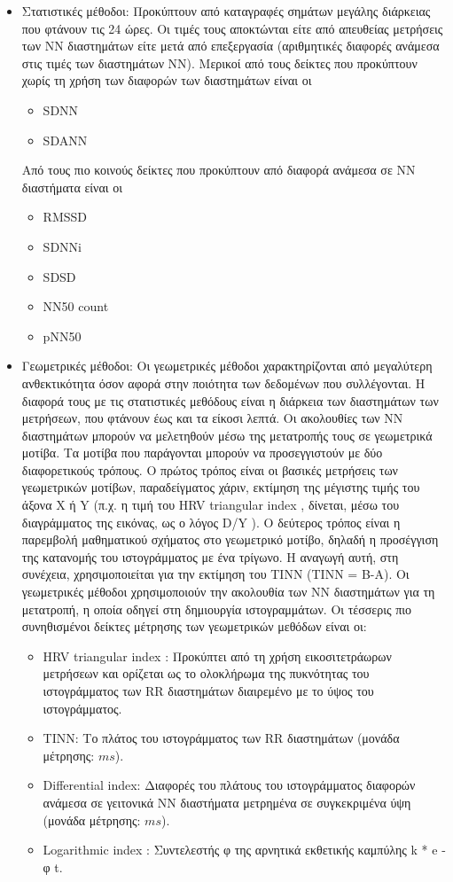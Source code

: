 \begin{itemize}
	\item Στατιστικές μέθοδοι: Προκύπτουν από καταγραφές σημάτων μεγάλης διάρκειας που φτάνουν τις 24 ώρες. Οι τιμές τους αποκτώνται είτε από απευθείας μετρήσεις των ΝΝ διαστημάτων είτε μετά από επεξεργασία (αριθμητικές διαφορές ανάμεσα στις τιμές των διαστημάτων ΝΝ). Μερικοί από τους δείκτες που προκύπτουν χωρίς τη χρήση των διαφορών των διαστημάτων είναι οι
	\begin{itemize}
		\item \en SDNN
		\item SDANN \gr
	\end{itemize}
	Από τους πιο κοινούς δείκτες που προκύπτουν από διαφορά ανάμεσα σε ΝΝ διαστήματα είναι οι
	\begin{itemize}
		\item \en RMSSD
		\item SDNNi
		\item SDSD
		\item NN50 count
		\item pNN50 \gr
	\end{itemize}
	\item Γεωμετρικές μέθοδοι: Οι γεωμετρικές μέθοδοι χαρακτηρίζονται από μεγαλύτερη ανθεκτικότητα όσον αφορά στην ποιότητα των δεδομένων που συλλέγονται. Η διαφορά τους με τις στατιστικές μεθόδους είναι η διάρκεια των διαστημάτων των μετρήσεων, που φτάνουν έως και τα είκοσι λεπτά. Οι ακολουθίες των ΝΝ διαστημάτων μπορούν να μελετηθούν μέσω της μετατροπής τους σε γεωμετρικά μοτίβα. Τα μοτίβα που παράγονται μπορούν να προσεγγιστούν με δύο διαφορετικούς τρόπους. Ο πρώτος τρόπος είναι οι βασικές μετρήσεις των γεωμετρικών μοτίβων, παραδείγματος χάριν, εκτίμηση της μέγιστης τιμής του άξονα Χ ή \en Y \gr (π.χ. η τιμή του \en HRV triangular index \gr, δίνεται, μέσω του διαγράμματος της εικόνας, ως ο λόγος \en D/Y \gr). O δεύτερος τρόπος είναι η παρεμβολή μαθηματικού σχήματος στο γεωμετρικό μοτίβο, δηλαδή η προσέγγιση της κατανομής του ιστογράμματος με ένα τρίγωνο. Η αναγωγή αυτή, στη συνέχεια, χρησιμοποιείται για την εκτίμηση του ΤΙΝΝ (ΤΙΝΝ = Β-Α).
	Οι γεωμετρικές μέθοδοι χρησιμοποιούν την ακολουθία των ΝΝ διαστημάτων για τη μετατροπή, η οποία οδηγεί στη δημιουργία ιστογραμμάτων. Οι τέσσερις πιο συνηθισμένοι δείκτες μέτρησης των γεωμετρικών μεθόδων είναι οι: 
	\begin{itemize}
		\item \en HRV triangular index \gr: Προκύπτει από τη χρήση εικοσιτετράωρων μετρήσεων και ορίζεται ως το ολοκλήρωμα της πυκνότητας του ιστογράμματος των \en RR \gr διαστημάτων διαιρεμένο με το ύψος του ιστογράμματος.
		\item ΤΙΝΝ: Το πλάτος του ιστογράμματος των \en RR \gr διαστημάτων (μονάδα μέτρησης: \en $ms$).\gr
		\item \en Differential index: \gr Διαφορές του πλάτους του ιστογράμματος διαφορών ανάμεσα σε γειτονικά ΝΝ διαστήματα μετρημένα σε συγκεκριμένα ύψη (μονάδα μέτρησης: \en $ms$).\gr
		\item \en Logarithmic index \gr: Συντελεστής φ της αρνητικά εκθετικής καμπύλης \en k * e - \gr φ \en t.
	\end{itemize}
\end{itemize}

